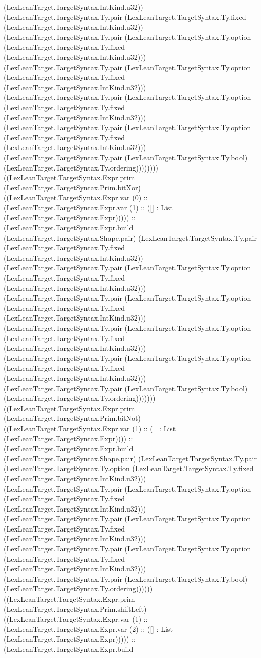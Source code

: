 \documentclass[11pt]{article}
\begin{document}
(LexLeanTarget.TargetSyntax.IntKind.u32)) (LexLeanTarget.TargetSyntax.Ty.pair (LexLeanTarget.TargetSyntax.Ty.fixed (LexLeanTarget.TargetSyntax.IntKind.u32)) (LexLeanTarget.TargetSyntax.Ty.pair (LexLeanTarget.TargetSyntax.Ty.option (LexLeanTarget.TargetSyntax.Ty.fixed (LexLeanTarget.TargetSyntax.IntKind.u32))) (LexLeanTarget.TargetSyntax.Ty.pair (LexLeanTarget.TargetSyntax.Ty.option (LexLeanTarget.TargetSyntax.Ty.fixed (LexLeanTarget.TargetSyntax.IntKind.u32))) (LexLeanTarget.TargetSyntax.Ty.pair (LexLeanTarget.TargetSyntax.Ty.option (LexLeanTarget.TargetSyntax.Ty.fixed (LexLeanTarget.TargetSyntax.IntKind.u32))) (LexLeanTarget.TargetSyntax.Ty.pair (LexLeanTarget.TargetSyntax.Ty.option (LexLeanTarget.TargetSyntax.Ty.fixed (LexLeanTarget.TargetSyntax.IntKind.u32))) (LexLeanTarget.TargetSyntax.Ty.pair (LexLeanTarget.TargetSyntax.Ty.bool) (LexLeanTarget.TargetSyntax.Ty.ordering)))))))) ((LexLeanTarget.TargetSyntax.Expr.prim (LexLeanTarget.TargetSyntax.Prim.bitXor) ((LexLeanTarget.TargetSyntax.Expr.var (0) :: (LexLeanTarget.TargetSyntax.Expr.var (1) :: ([] : List (LexLeanTarget.TargetSyntax.Expr))))) :: (LexLeanTarget.TargetSyntax.Expr.build (LexLeanTarget.TargetSyntax.Shape.pair) (LexLeanTarget.TargetSyntax.Ty.pair (LexLeanTarget.TargetSyntax.Ty.fixed (LexLeanTarget.TargetSyntax.IntKind.u32)) (LexLeanTarget.TargetSyntax.Ty.pair (LexLeanTarget.TargetSyntax.Ty.option (LexLeanTarget.TargetSyntax.Ty.fixed (LexLeanTarget.TargetSyntax.IntKind.u32))) (LexLeanTarget.TargetSyntax.Ty.pair (LexLeanTarget.TargetSyntax.Ty.option (LexLeanTarget.TargetSyntax.Ty.fixed (LexLeanTarget.TargetSyntax.IntKind.u32))) (LexLeanTarget.TargetSyntax.Ty.pair (LexLeanTarget.TargetSyntax.Ty.option (LexLeanTarget.TargetSyntax.Ty.fixed (LexLeanTarget.TargetSyntax.IntKind.u32))) (LexLeanTarget.TargetSyntax.Ty.pair (LexLeanTarget.TargetSyntax.Ty.option (LexLeanTarget.TargetSyntax.Ty.fixed (LexLeanTarget.TargetSyntax.IntKind.u32))) (LexLeanTarget.TargetSyntax.Ty.pair (LexLeanTarget.TargetSyntax.Ty.bool) (LexLeanTarget.TargetSyntax.Ty.ordering))))))) ((LexLeanTarget.TargetSyntax.Expr.prim (LexLeanTarget.TargetSyntax.Prim.bitNot) ((LexLeanTarget.TargetSyntax.Expr.var (1) :: ([] : List (LexLeanTarget.TargetSyntax.Expr)))) :: (LexLeanTarget.TargetSyntax.Expr.build (LexLeanTarget.TargetSyntax.Shape.pair) (LexLeanTarget.TargetSyntax.Ty.pair (LexLeanTarget.TargetSyntax.Ty.option (LexLeanTarget.TargetSyntax.Ty.fixed (LexLeanTarget.TargetSyntax.IntKind.u32))) (LexLeanTarget.TargetSyntax.Ty.pair (LexLeanTarget.TargetSyntax.Ty.option (LexLeanTarget.TargetSyntax.Ty.fixed (LexLeanTarget.TargetSyntax.IntKind.u32))) (LexLeanTarget.TargetSyntax.Ty.pair (LexLeanTarget.TargetSyntax.Ty.option (LexLeanTarget.TargetSyntax.Ty.fixed (LexLeanTarget.TargetSyntax.IntKind.u32))) (LexLeanTarget.TargetSyntax.Ty.pair (LexLeanTarget.TargetSyntax.Ty.option (LexLeanTarget.TargetSyntax.Ty.fixed (LexLeanTarget.TargetSyntax.IntKind.u32))) (LexLeanTarget.TargetSyntax.Ty.pair (LexLeanTarget.TargetSyntax.Ty.bool) (LexLeanTarget.TargetSyntax.Ty.ordering)))))) ((LexLeanTarget.TargetSyntax.Expr.prim (LexLeanTarget.TargetSyntax.Prim.shiftLeft) ((LexLeanTarget.TargetSyntax.Expr.var (1) :: (LexLeanTarget.TargetSyntax.Expr.var (2) :: ([] : List (LexLeanTarget.TargetSyntax.Expr))))) :: (LexLeanTarget.TargetSyntax.Expr.build 
\end{document}
